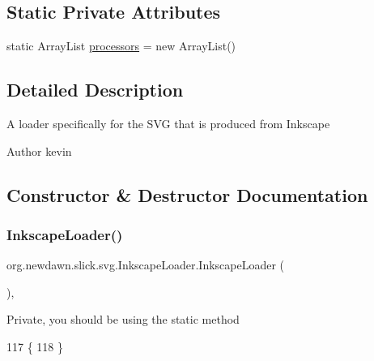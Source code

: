 \subsection*{Static Private Attributes}
\begin{DoxyCompactItemize}
\item 
static Array\+List \mbox{\hyperlink{classorg_1_1newdawn_1_1slick_1_1svg_1_1_inkscape_loader_a7ea6c8ad87a772c53ee88c0e3a9e9146}{processors}} = new Array\+List()
\end{DoxyCompactItemize}


\subsection{Detailed Description}
A loader specifically for the S\+VG that is produced from Inkscape

\begin{DoxyAuthor}{Author}
kevin 
\end{DoxyAuthor}


\subsection{Constructor \& Destructor Documentation}
\mbox{\label{classorg_1_1newdawn_1_1slick_1_1svg_1_1_inkscape_loader_a02b783a62cfaf619034970a97679625a}} 
\subsubsection{\texorpdfstring{Inkscape\+Loader()}{InkscapeLoader()}}
{\footnotesize\ttfamily org.\+newdawn.\+slick.\+svg.\+Inkscape\+Loader.\+Inkscape\+Loader (\begin{DoxyParamCaption}{ }\end{DoxyParamCaption})\hspace{0.3cm}{\ttfamily [inline]}, {\ttfamily [private]}}

Private, you should be using the static method 
\begin{DoxyCode}
117                              \{
118     \}
\end{DoxyCode}


